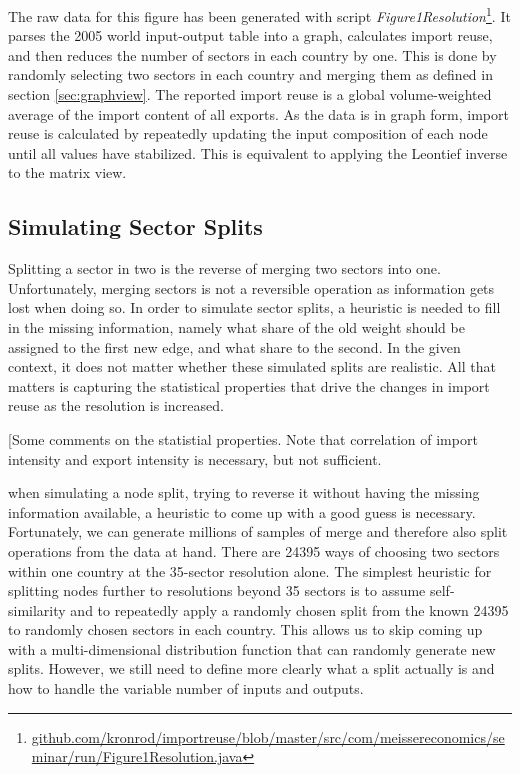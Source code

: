 \documentclass[english]{uzhpub}
\begin{document}
The raw data for this figure has been generated with script \emph{Figure1Resolution}\footnote{\href{https://github.com/kronrod/importreuse/blob/master/src/com/meissereconomics/seminar/run/Figure1Resolution.java}{github.com/kronrod/importreuse/blob/master/src/com/meissereconomics/seminar/run/Figure1Resolution.java}}. It parses the 2005 world input-output table into a graph, calculates import reuse, and then reduces the number of sectors in each country by one. This is done by randomly selecting two sectors in each country and merging them as defined in section \ref{sec:graphview}. The reported import reuse is a global volume-weighted average of the import content of all exports. As the data is in graph form, import reuse is calculated by repeatedly updating the input composition of each node until all values have stabilized. This is equivalent to applying the Leontief inverse to the matrix view.

\subsection{Simulating Sector Splits}
Splitting a sector in two is the reverse of merging two sectors into one. Unfortunately, merging sectors is not a reversible operation as information gets lost when doing so. In order to simulate sector splits, a heuristic is needed to fill in the missing information, namely what share of the old weight should be assigned to the first new edge, and what share to the second. In the given context, it does not matter whether these simulated splits are realistic. All that matters is capturing the statistical properties that drive the changes in import reuse as the resolution is increased.

[Some comments on the statistial properties. Note that correlation of import intensity and export intensity is necessary, but not sufficient.

when simulating a node split, trying to reverse it without having the missing information available, a heuristic to come up with a good guess is necessary. Fortunately, we can generate millions of samples of merge and therefore also split operations from the data at hand. There are 24395 ways of choosing two sectors within one country at the 35-sector resolution alone. The simplest heuristic for splitting nodes further to resolutions beyond 35 sectors is to assume self-similarity and to repeatedly apply a randomly chosen split from the known 24395 to randomly chosen sectors in each country. This allows us to skip coming up with a multi-dimensional distribution function that can randomly generate new splits. However, we still need to define more clearly what a split actually is and how to handle the variable number of inputs and outputs.
\end{document}
